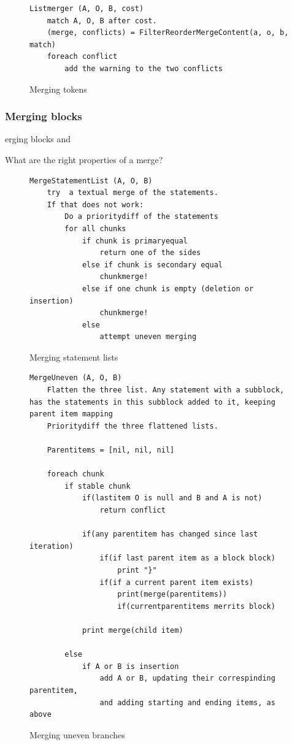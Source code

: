 \documentclass[11pt]{article}
\begin{document}

\begin{figure}
  \caption{Merging tokens}
  \label{Listmerger}
\begin{verbatim}
Listmerger (A, O, B, cost)
    match A, O, B after cost.
    (merge, conflicts) = FilterReorderMergeContent(a, o, b, match)
    foreach conflict
        add the warning to the two conflicts

\end{verbatim}
\end{figure}

\subsubsection{Merging blocks}
erging blocks and 


What are the right properties of a merge?

\begin{figure}
  \caption{Merging statement lists}
  \label{MergeStatementList}
\begin{verbatim}
MergeStatementList (A, O, B)
    try  a textual merge of the statements.
    If that does not work:
        Do a prioritydiff of the statements
        for all chunks
            if chunk is primaryequal
                return one of the sides
            else if chunk is secondary equal
                chunkmerge!
            else if one chunk is empty (deletion or insertion)
                chunkmerge!
            else 
                attempt uneven merging

\end{verbatim}
\end{figure}

\begin{figure}
  \caption{Merging uneven branches}
  \label{MergeToken}
\begin{verbatim}
MergeUneven (A, O, B)
    Flatten the three list. Any statement with a subblock, has the statements in this subblock added to it, keeping parent item mapping
    Prioritydiff the three flattened lists.

    Parentitems = [nil, nil, nil]

    foreach chunk
        if stable chunk
            if(lastitem O is null and B and A is not)
                return conflict

            if(any parentitem has changed since last iteration)
                if(if last parent item as a block block)
                    print "}"
                if(if a current parent item exists)
                    print(merge(parentitems))
                    if(currentparentitems merrits block)
            
            print merge(child item)

        else 
            if A or B is insertion
                add A or B, updating their correspinding parentitem,
                and adding starting and ending items, as above
\end{verbatim}
\end{figure}
\end{document}

